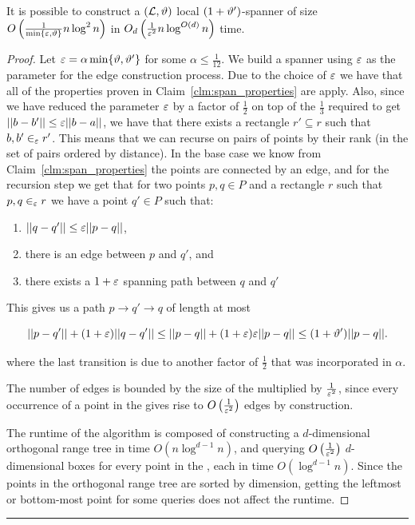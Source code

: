 \documentclass[12pt]{article}%
\begin{document}
    \begin{claim}
	It is possible to construct a $(\mathcal{L}, \vartheta)$ local
        $(1+\vartheta')$-spanner of size
        $O\left(\frac{1}{\min\{\varepsilon, \vartheta\}}n\log^2n\right)$ in
        $O_d\left(\frac{1}{\varepsilon^2}n\log^{O(d)}n\right)$ time.
    \end{claim}

\begin{proof} 
    Let $\varepsilon = \alpha \min \{\vartheta,\vartheta'\}$ for some
    $\alpha \leq \frac{1}{12}$. We build a spanner using $\varepsilon$ as the
    parameter for the edge construction process. Due to the choice of
    $\varepsilon$ we have that all of the properties proven in
    Claim~\ref{clm:span_properties} are apply. Also, since we have
    reduced the parameter $\varepsilon$ by a factor of $\frac{1}{2}$ on top
    of the $\frac{1}{3}$ required to get $||b-b'||\leq \varepsilon ||b-a||$,
    we have that there exists a rectangle $r'\subseteq r$ such that
    $b,b'\in_{\varepsilon}r'$. This means that we can recurse on pairs of
    points by their rank (in the set of pairs ordered by distance). In
    the base case we know from Claim~\ref{clm:span_properties} the
    points are connected by an edge, and for the recursion step we get
    that for two points $p,q\in P$ and a rectangle $r$ such that
    $p,q\in_{\varepsilon} r$ we have a point $q'\in P$ such that:
    \begin{enumerate}
        \item $||q-q'||\leq \varepsilon||p-q||$,
        \item there is an edge between $p$ and $q'$, and
        \item there exists a $1+\varepsilon$ spanning path between $q$ and
        $q'$
    \end{enumerate}

    This gives us a path $p\rightarrow q' \rightarrow q$ of length at
    most
	
	\begin{equation}
            ||p-q'||+(1+\varepsilon)||q-q'||\leq
            ||p-q||+(1+\varepsilon)\varepsilon||p-q||\leq (1+\vartheta')||p-q||.
        \end{equation}
	
	where the last transition is due to another factor of
        $\frac{1}{2}$ that was incorporated in $\alpha$.
	
	The number of edges is bounded by the size of the \QSPD
        multiplied by $\frac{1}{\varepsilon^2}$, since every occurrence of a
        point in the \QSPD gives rise to
        $O\left(\frac{1}{\varepsilon^2}\right)$ edges by construction.
	
	The runtime of the algorithm is composed of constructing a
        $d$-dimensional orthogonal range tree in time
        $O(n\log^{d-1}n)$, and querying
        $O\left(\frac{1}{\varepsilon^2}\right)$ $d$-dimensional boxes for
        every point in the \QSPD, each in time $O(\log^{d-1}n)$. Since
        the points in the orthogonal range tree are sorted by
        dimension, getting the leftmost or bottom-most point for some
        queries does not affect the runtime.
	
\end{proof}
\hrule
\end{document}

